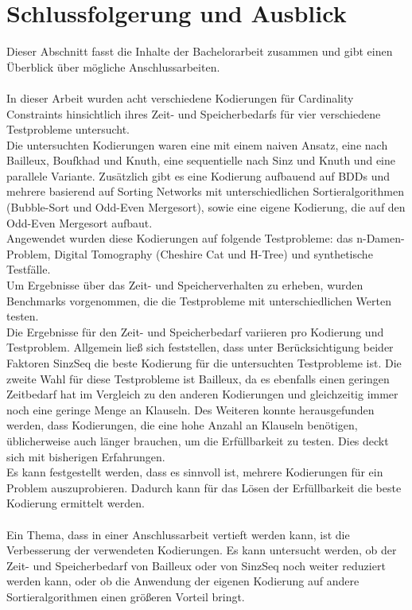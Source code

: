 \documentclass[a4,abstract=on]{scrartcl}
\newcommand*\stdsection{}
\let\stdsection\section
\renewcommand*\section{%
    \clearpage\ifodd\value{page}\else\mbox{}\clearpage\fi
    \stdsection}
\begin{document}
\section{Schlussfolgerung und Ausblick}
Dieser Abschnitt fasst die Inhalte der Bachelorarbeit zusammen und gibt einen Überblick über mögliche Anschlussarbeiten.\\
\ \\
In dieser Arbeit wurden acht verschiedene Kodierungen für Cardinality Constraints hinsichtlich ihres Zeit- und Speicherbedarfs für vier verschiedene Testprobleme untersucht.\\
Die untersuchten Kodierungen waren eine mit einem naiven Ansatz, eine nach Bailleux, Boufkhad und Knuth, eine sequentielle nach Sinz und Knuth und eine parallele Variante. Zusätzlich gibt es eine Kodierung aufbauend auf BDDs und mehrere basierend auf Sorting Networks mit unterschiedlichen Sortieralgorithmen (Bubble-Sort und Odd-Even Mergesort), sowie eine eigene Kodierung, die auf den Odd-Even Mergesort aufbaut.\\
Angewendet wurden diese Kodierungen auf folgende Testprobleme: das n-Damen-Problem, Digital Tomography (Cheshire Cat und H-Tree) und synthetische Testfälle.\\
Um Ergebnisse über das Zeit- und Speicherverhalten zu erheben, wurden Benchmarks vorgenommen, die die Testprobleme mit unterschiedlichen Werten testen. \\
Die Ergebnisse für den Zeit- und Speicherbedarf variieren pro Kodierung und Testproblem. Allgemein ließ sich feststellen, dass unter Berücksichtigung beider Faktoren SinzSeq die beste Kodierung für die untersuchten Testprobleme ist. Die zweite Wahl für diese Testprobleme ist Bailleux, da es ebenfalls einen geringen Zeitbedarf hat im Vergleich zu den anderen Kodierungen und gleichzeitig immer noch eine geringe Menge an Klauseln. Des Weiteren konnte herausgefunden werden, dass Kodierungen, die eine hohe Anzahl an Klauseln benötigen, üblicherweise auch länger brauchen, um die Erfüllbarkeit zu testen. Dies deckt sich mit bisherigen Erfahrungen.\\
Es kann festgestellt werden, dass es sinnvoll ist, mehrere Kodierungen für ein Problem auszuprobieren. Dadurch kann für das Lösen der Erfüllbarkeit die beste Kodierung ermittelt werden.\\
\ \\
Ein Thema, dass in einer Anschlussarbeit vertieft werden kann, ist die Verbesserung der verwendeten Kodierungen. Es kann untersucht werden, ob der Zeit- und Speicherbedarf von Bailleux oder von SinzSeq noch weiter reduziert werden kann, oder ob die Anwendung der eigenen Kodierung auf andere Sortieralgorithmen einen größeren Vorteil bringt.\\
\end{document}
